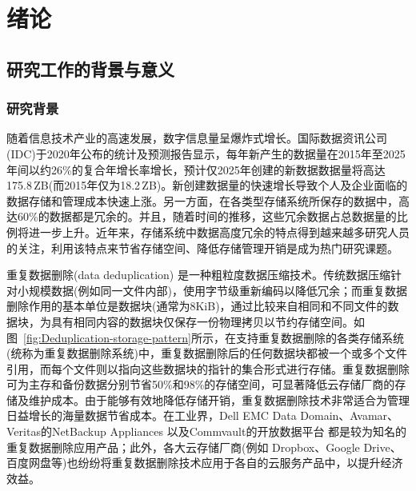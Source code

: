 \chapter{绪\hspace{6pt}论}
\label{chapter:introduction}

\section{研究工作的背景与意义}
\label{sec:intro}
\subsection{研究背景}
\label{subsec:intro-background}

随着信息技术产业的高速发展，数字信息量呈爆炸式增长。国际数据资讯公司(IDC)\cite{IDC}于2020年公布的统计及预测报告\cite{DataReport2020}显示，每年新产生的数据量在2015年至2025年间以约26\%的复合年增长率增长，预计仅2025年创建的新数据数据量将高达175.8\,ZB(而2015年仅为18.2\,ZB)。新创建数据量的快速增长导致个人及企业面临的数据存储和管理成本快速上涨\cite{敖莉2010重复数据删除技术}。另一方面，在各类型存储系统所保存的数据中，高达60\%的数据都是冗余的。并且，随着时间的推移，这些冗余数据占总数据量的比例将进一步上升\cite{mcknight2006digital}。近年来，存储系统中数据高度冗余的特点得到越来越多研究人员的关注，利用该特点来节省存储空间、降低存储管理开销是成为热门研究课题。

重复数据删除(data deduplication)\cite{付印金2012重复数据删除关键技术研究进展, 敖莉2010重复数据删除技术,xia2016Deduplication,Paulo2014} 是一种粗粒度数据压缩技术。传统数据压缩针对小规模数据(例如同一文件内部)，使用字节级重新编码以降低冗余；而重复数据删除作用的基本单位是数据块(通常为8KiB)，通过比较来自相同和不同文件的数据块，为具有相同内容的数据块仅保存一份物理拷贝以节约存储空间。如图~\ref{fig:Deduplication-storage-pattern}所示，在支持重复数据删除的各类存储系统(统称为重复数据删除系统)中，重复数据删除后的任何数据块都被一个或多个文件引用，而每个文件则以指向这些数据块的指针的集合形式进行存储。重复数据删除可为主存和备份数据分别节省50\%\cite{meyer2011deduplication}和98\%\cite{wallace12}的存储空间，可显著降低云存储厂商的存储及维护成本\cite{付印金2012重复数据删除关键技术研究进展}。由于能够有效地降低存储开销，重复数据删除技术非常适合为管理日益增长的海量数据节省成本。在工业界，Dell EMC Data Domain\cite{EMCDataDomain}、Avamar\cite{Avamar}、Veritas的NetBackup Appliances\cite{veritas} 以及Commvault的开放数据平台\cite{CommVault} 都是较为知名的重复数据删除应用产品；此外，各大云存储厂商(例如 Dropbox\cite{Dropbox}、Google Drive\cite{GoogleDrive}、百度网盘\cite{BaiduPan}等)也纷纷将重复数据删除技术应用于各自的云服务产品中，以提升经济效益\cite{harnik2010side}。  

